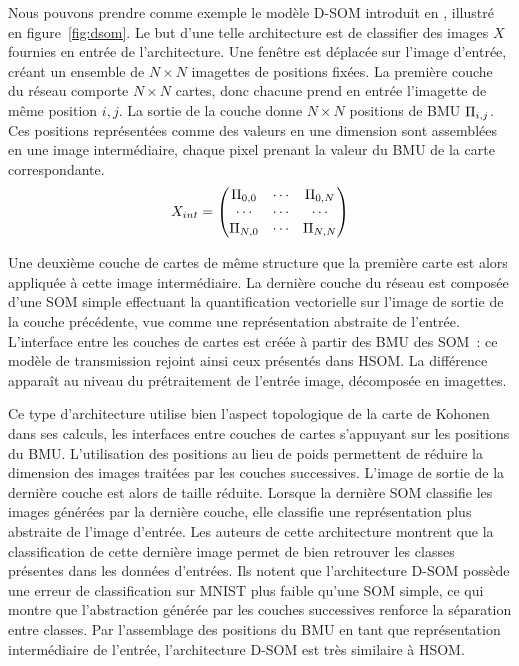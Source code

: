 \documentclass[../main]{subfiles}
\begin{document}
Nous pouvons prendre comme exemple le modèle D-SOM introduit en \cite{liu_deep_2015,wickramasinghe_deep_2019}, illustré en figure~\ref{fig:dsom}.
Le but d'une telle architecture est de classifier des images $X$ fournies en entrée de l'architecture.
Une fenêtre est déplacée sur l'image d'entrée, créant un ensemble de $N\times N$ imagettes de positions fixées. La première couche du réseau comporte $N \times N$ cartes, donc chacune prend en entrée l'imagette de même position $i,j$.
La sortie de la couche donne $N  \times N$ positions de BMU $\Pi_{i,j}$.
Ces positions représentées comme des valeurs en une dimension sont assemblées en une image intermédiaire, chaque pixel prenant la valeur du BMU de la carte correspondante.
    $$X_{int} = \begin{pmatrix}
    \Pi_{0,0}  &  \cdots & \Pi_{0,N} \\
    \cdots & \cdots & \cdots \\
    \Pi_{N,0} & \cdots & \Pi_{N,N}
    \end{pmatrix} $$

Une deuxième couche de cartes de même structure que la première carte est alors appliquée à cette image intermédiaire. La dernière couche du réseau est composée d'une SOM simple effectuant la quantification vectorielle sur l'image de sortie de la couche précédente, vue comme une représentation abstraite de l'entrée.
L'interface entre les couches de cartes est créée à partir des BMU des SOM~: ce modèle de transmission rejoint ainsi ceux présentés dans HSOM. La différence apparaît au niveau du prétraitement de l'entrée image, décomposée en imagettes.

Ce type d'architecture utilise bien l'aspect topologique de la carte de Kohonen dans ses calculs, les interfaces entre couches de cartes s'appuyant sur les positions du BMU. L'utilisation des positions au lieu de poids permettent de réduire la dimension des images traitées par les couches successives. L'image de sortie de la dernière couche est alors de taille réduite. Lorsque la dernière SOM classifie les images générées par la dernière couche, elle classifie une représentation plus abstraite de l'image d'entrée. 
Les auteurs de cette architecture montrent que la classification de cette dernière image permet de bien retrouver les classes présentes dans les données d'entrées. Ils notent que l'architecture D-SOM possède une erreur de classification sur MNIST plus faible qu'une SOM simple, ce qui montre que l'abstraction générée par les couches successives renforce la séparation entre classes.
Par l'assemblage des positions du BMU en tant que représentation intermédiaire de l'entrée, l'architecture D-SOM est très similaire à HSOM.
\end{document}
